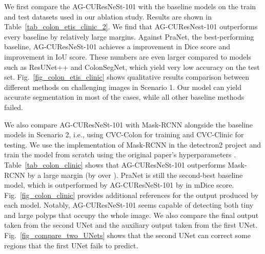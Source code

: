 \documentclass[review, sort&compress]{elsarticle}
\begin{document}
We first compare the AG-CUResNeSt-101 with the baseline models on the train and test datasets used in our ablation study. Results are shown in Table~\ref{tab_colon_etis_clinic_2}. We find that AG-CUResNest-101 outperforms every baseline by relatively large margins. Against PraNet, the best-performing baseline, AG-CUResNeSt-101 achieves a  improvement in Dice score and  improvement in IoU score. These numbers are even larger compared to models such as ResUNet++ and ColonSegNet, which yield very low accuracy on the test set. Fig.~\ref{fig_colon_etis_clinic} shows qualitative results comparison between different methods on challenging images in Scenario 1. Our model can yield accurate segmentation in most of the cases, while all other baseline methods failed.

We also compare AG-CUResNeSt-101 with Mask-RCNN \cite{qadir2019polyp} alongside the baseline models in Scenario 2, i.e., using CVC-Colon for training and CVC-Clinic for testing. We use the implementation of Mask-RCNN in the detectron2 project and train the model from scratch using the original paper's hyperparameters \cite{qadir2019polyp}. Table~\ref{tab_colon_clinic} shows that AG-CUResNeSt-101 outperforms Mask-RCNN by a large margin (by over ). PraNet is still the second-best baseline model, which is outperformed by AG-CUResNeSt-101 by  in mDice score. Fig.~\ref{fig_colon_clinic} provides additional references for the output produced by each model. Notably, AG-CUResNeSt-101 seems capable of detecting both tiny and large polyps that occupy the whole image. We also compare the final output taken from the second UNet and the auxiliary output taken from the first UNet. Fig.~\ref{fig_compare_two_UNets} shows that the second UNet can correct some regions that the first UNet fails to predict.
\end{document}
